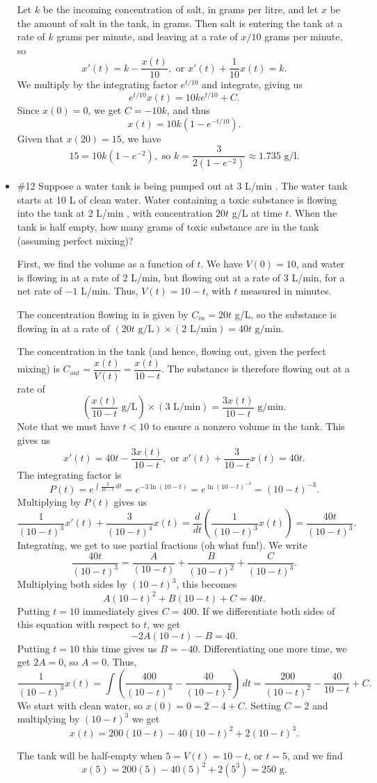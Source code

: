 \documentclass[12pt,letterpaper]{article}
\begin{document}
\begin{itemize}
\bigskip

Let $k$ be the incoming concentration of salt, in grams per litre, and let $x$ be the amount of salt in the tank, in grams. Then salt is entering the tank at a rate of $k$ grams per minute, and leaving at a rate of $x/10$ grams per minute, so
\[
x'(t)=k-\frac{x(t)}{10}, \text{ or } x'(t)+\frac{1}{10}x(t)=k.
\]
We multiply by the integrating factor $e^{t/10}$ and integrate, giving us
\[
e^{t/10}x(t) = 10ke^{t/10}+C.
\]
Since $x(0)=0$, we get $C=-10k$, and thus
\[
x(t) = 10k(1-e^{-t/10}).
\]
Given that $x(20)=15$, we have
\[
15 = 10k(1-e^{-2}), \text{ so } k = \frac{3}{2(1-e^{-2})}\approx 1.735 \text{ g/l}.
\]

\item \#12 Suppose a water tank is being pumped out at 3 L/min . The
water tank starts at 10 L of clean water. Water containing a toxic
substance is flowing into the tank at 2 L/min , with concentration $20t$ g/L at time $t$. When the tank is half empty, how
many grams of toxic substance are in the tank (assuming
perfect mixing)?

\bigskip

First, we find the volume as a function of $t$. We have $V(0)=10$, and water is flowing in at a rate of 2 L/min, but flowing out at a rate of 3 L/min, for a net rate of $-1$ L/min. Thus, $V(t) = 10-t$, with $t$ measured in minutes. 

The concentration flowing in is given by $C_{in} = 20t$ g/L, so the substance is flowing in at a rate of $(20t \text{ g/L})\times (2 \text{ L/min}) = 40t \text{ g/min}$.

The concentration in the tank (and hence, flowing out, given the perfect mixing) is $C_{out} = \dfrac{x(t)}{V(t)} = \dfrac{x(t)}{10-t}$. The substance is therefore flowing out at a rate of
\[
\left(\frac{x(t)}{10-t} \text{ g/L}\right)\times (3 \text{ L/min}) = \frac{3x(t)}{10-t} \text{ g/min}.
\]
Note that we must have $t<10$ to ensure a nonzero volume in the tank. This gives us
\[
x'(t) = 40t-\frac{3x(t)}{10-t}, \text{ or } x'(t)+\frac{3}{10-t}x(t) = 40t.
\]
The integrating factor is
\[
P(t) = e^{\int\frac{3}{10-t}\,dt} = e^{-3\ln(10-t)} = e^{\ln(10-t)^{-3}} = (10-t)^{-3}.
\]
Multiplying by $P(t)$ gives us
\[
\frac{1}{(10-t)^3}x'(t)+\frac{3}{(10-t)^4}x(t) = \frac{d}{dt}\left(\frac{1}{(10-t)^3}x(t)\right)= \frac{40t}{(10-t)^3}.
\]
Integrating, we get to use partial fractions (oh what fun!). We write
\[
\frac{40t}{(10-t)^3} = \frac{A}{(10-t)}+\frac{B}{(10-t)^2}+\frac{C}{(10-t)^3}.
\]
Multiplying both sides by $(10-t)^3$, this becomes
\[
A(10-t)^2+B(10-t)+C=40t.
\]
Putting $t=10$ immediately gives $C=400$. If we differentiate both sides of this equation with respect to $t$, we get
\[
-2A(10-t)-B=40.
\]
Putting $t=10$ this time gives us $B=-40$. Differentiating one more time, we get $2A=0$, so $A=0$. Thus,
\[
\frac{1}{(10-t)^3}x(t) = \int\left(\frac{400}{(10-t)^3}-\frac{40}{(10-t)^2}\right)\,dt
 = \frac{200}{(10-t)^2}-\frac{40}{10-t}+C.
\]
We start with clean water, so $x(0)=0 = 2-4+C$. Setting $C=2$ and multiplying by $(10-t)^3$ we get
\[
x(t) = 200(10-t)-40(10-t)^2+2(10-t)^3.
\]

The tank will be half-empty when $5=V(t)=10-t$, or $t=5$, and we find
\[
x(5) = 200(5)-40(5)^2+2(5^3) = 250 \text{ g}.
\]
\end{itemize}
\end{document}
